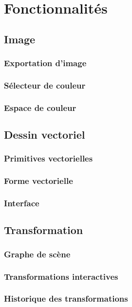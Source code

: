 \chapter{Fonctionnalités}
\label{s:fonctionnalités}

\section{Image}
\subsection{Exportation d'image}
\subsection{Sélecteur de couleur}
\subsection{Espace de couleur}

\section{Dessin vectoriel}
\subsection{Primitives vectorielles}
\subsection{Forme vectorielle}
\subsection{Interface}

\section{Transformation}
\subsection{Graphe de scène}
\subsection{Transformations interactives}
\subsection{Historique des transformations}
